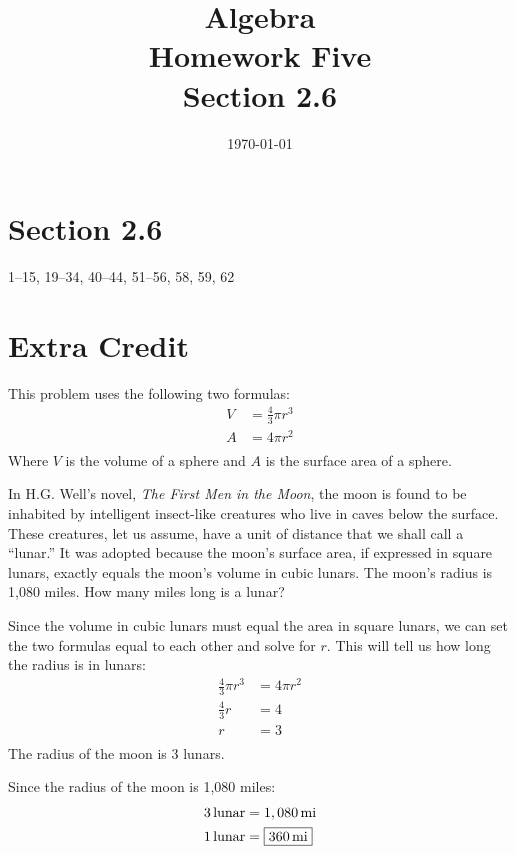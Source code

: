 \documentclass[letterpaper, landscape]{exam}
\title{Algebra \\ Homework Five \\ Section 2.6 }
\author{}
\date{\today}
\begin{document}
  \maketitle

 \section{Section 2.6}
  1--15, 19--34, 40--44, 51--56, 58, 59, 62

  \section{Extra Credit}

  This problem uses the following two formulas:
  \begin{align*}
    V & = \frac{4}{3} \pi r^3 \\
    A & = 4 \pi r^2 \\
  \end{align*}
  Where $V$ is the volume of a sphere and $A$ is the surface area of a sphere.

  In H.G. Well's novel, {\em The First Men in the Moon}, the moon is found
  to be inhabited by intelligent insect-like creatures who live in caves
  below the surface.  These creatures, let us assume, have a unit of
  distance that we shall call a ``lunar.''  It was adopted because the
  moon's surface area, if expressed in square lunars, exactly equals the
  moon's volume in cubic lunars.  The moon's radius is 1,080 miles.  How
  many miles long is a lunar?

  \begin{solution}
    Since the volume in cubic lunars must equal the area in square lunars,
    we can set the two formulas equal to each other and solve for $r$.
    This will tell us how long the radius is in lunars:
    \begin{align*}
      \frac{4}{3} \pi r^3 & = 4 \pi r^2 \\
      \frac{4}{3} r       & = 4 \\
      r                   & = 3 \\
    \end{align*}
    The radius of the moon is 3 lunars. 
    
    Since the radius of the moon is 1,080 miles:
    \begin{align*}
      \unit[3]{lunar} &= \unit[1,080]{mi} \\
      \unit[1]{lunar} &= \boxed{ \unit[360]{mi} } \\
    \end{align*}

  \end{solution}
\end{document}
